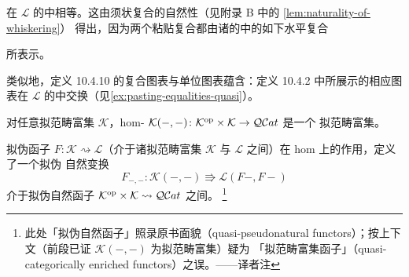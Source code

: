 \begin{remark}
\begin{center}
\end{center}
在 $\mathcal{L}$ 的\trHomotopyTwoCategory{}中相等。这由须状复合的自然性（见附录 B 中的%
\cref{lem:naturality-of-whiskering}）
得出，因为两个粘贴复合都由诸\trQuasiCategory{}的\trHomotopyTwoCategory{}中的如下水平复合
\begin{center}
\end{center}
所表示。

类似地，定义 10.4.10 的复合图表与单位图表蕴含：定义 10.4.2 中所展示的相应图表在
$\mathcal{L}$ 的\trHomotopyTwoCategory{}中交换（见\cref{ex:pasting-equalities-quasi}）。
\end{remark}

对任意拟范畴富集\trCategory{} $\mathcal{K}$，hom-\trBifunctor{}
$\mathcal{K}(-,-)\colon\mathcal{K}^{\mathrm{op}}\times\mathcal{K}\to\mathcal{Q}\mathcal{C}at{}$ 是一个
拟范畴富集\trFunctor。

\begin{lemma}\label{lem:action-on-homs-qpn}
拟伪函子 $F\colon\mathcal{K}\rightsquigarrow\mathcal{L}$（介于诸拟范畴富集%
\trCategory{} $\mathcal{K}$ 与 $\mathcal{L}$ 之间）在 hom 上的作用，定义了一个拟伪
自然变换
\begin{equation*}
F_{-,-}\colon\mathcal{K}(-,-)\Rrightarrow\mathcal{L}(F-,F-)
\end{equation*}
介于拟伪自然函子 $\mathcal{K}^{\mathrm{op}}\times\mathcal{K}\rightsquigarrow\mathcal{Q}\mathcal{C}at{}$
之间。
\footnote{此处「拟伪自然函子」照录原书面貌（quasi-pseudonatural
functors）；按上下文（前段已证 $\mathcal{K}(-,-)$ 为拟范畴富集\trFunctor）疑为
「拟范畴富集函子」（quasi-categorically enriched functors）之误。——译者注}
\end{lemma}

